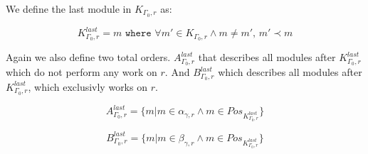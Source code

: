 We define the last module in $K_{\Gamma_0 ,r}$ as:

\[K_{\Gamma_0 ,r}^{last} = m \texttt{ where } \forall m' \in K_{\Gamma_0 ,r} \land m \neq m',\, m' \prec m \] 


Again we also define two total orders. $A_{\Gamma_0 ,r}^{last}$ that describes all modules after $K_{\Gamma_0 ,r}^{last}$ which do not perform any work on $r$. And $B_{\Gamma_0 ,r}^{last}$ which describes all modules after $K_{\Gamma_0 ,r}^{last}$, which exclusivly works on $r$.


\[ A_{\Gamma_0 ,r}^{last} = \{m | m \in \alpha_{\gamma ,r}  \land m \in Pos_{K_{\Gamma_0 ,r}^{last}} \} \]

\[B_{\Gamma_0 ,r}^{last} = \{m | m \in \beta_{\gamma ,r}  \land m \in Pos_{K_{\Gamma_0 ,r}^{last}} \}\]

